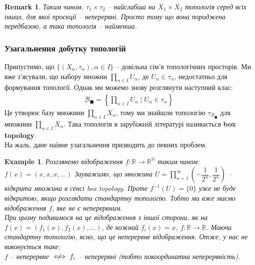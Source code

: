 \documentclass[a4paper, 10pt]{article}
\theoremstyle{theoremdd}
\newtheorem{example}[theorem]{Example}
\newtheorem{remark}[theorem]{Remark}
\begin{document}
\begin{remark}
Таким чином, $\tau_1 \times \tau_2$ -- найслабша на $X_1 \times X_2$ топологія серед всіх інших, для якої проєкції -- неперервні. Просто тому що вона породжена передбазою, а така топологія -- найменша.
\end{remark}

\subsubsection*{Узагальнення добутку топологій}
Припустимо, що $\{(X_\alpha,\tau_\alpha), \alpha \in I \}$ -- довільна сім'я топологічних просторів. Ми вже з'ясували, що набору множин $\displaystyle\prod_{\alpha \in I} U_\alpha$, де $U_\alpha \in \tau_\alpha$, недостатньо для формування топології. Однак ми можемо знову розглянути наступний клас:
\begin{align*}
\mathcal{B}_{\blacksquare} = \left\{ \prod_{\alpha \in I} U_\alpha \mid U_\alpha \in \tau_\alpha  \right\}
\end{align*}
Це утворює базу множини $\displaystyle\prod_{\alpha \in I} X_\alpha$, тому ми знайшли топологію $\tau_{\mathcal{B}_{\blacksquare}}$ для множини $\displaystyle\prod_{\alpha \in I} X_\alpha$. Така топологія в зарубіжній літературі називається \textbf{box topology}.\\
На жаль, дане наївне узагальнення призводить до певних проблем.

\begin{example}
Розглянемо відображення $f \colon \mathbb{R} \to \mathbb{R}^{\mathbb{N}}$ таким чином: $f(x) = (x,x,x,\dots)$ Зауважимо, що множина $U = \displaystyle\prod_{n=1}^\infty \left( -\dfrac{1}{2^n}, \dfrac{1}{2^n} \right)$ -- відкрита множина в сенсі box topology. Проте $f^{-1}(U) = \{0\}$ уже не буде відкритою, якщо розглядати стандартну топологію. Тобто ми вже маємо відображення $f$, яке не є неперервним.\\
При цьому подивимося на це відображення з іншої сторони, як на $f(x) = (f_1(x),f_2(x),\dots)$, де кожний $f_i(x) = x,\ f \colon \mathbb{R} \to \mathbb{R}$. Маючи стандартну топологію, ясно, що це неперервне відображення. Отже, у нас не виконується таке:\\
$f$ -- неперервне $\centernot\iff f_i$ -- неперервні (тобто покоординатна неперервність).
\end{example}
\end{document}
